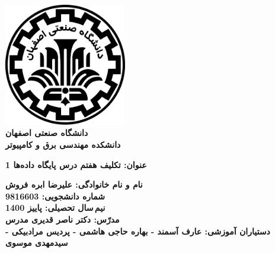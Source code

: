 \begin{titlepage}
\begin{center}
\includegraphics[width=0.4\textwidth]{figures/IUT Logo.png}\\
        
\LARGE
\textbf{دانشگاه صنعتی اصفهان}\\
\textbf{دانشکده مهندسی برق و کامپیوتر}\\
        
\vfill
        
\huge
\textbf{عنوان: تکلیف هفتم درس پایگاه داده‌ها 1}\\
        
\vfill
        
\LARGE
\textbf{نام و نام خانوادگی: علیرضا ابره فروش}\\
\textbf{شماره دانشجویی: 9816603}\\
\textbf{نیم\,سال تحصیلی: پاییز 1400}\\
\textbf{مدرّس: دکتر ناصر قدیری مدرس}\\
\textbf{دستیاران آموزشی: عارف آسمند - بهاره حاجی هاشمی - پردیس مرادبیکی - سیدمهدی موسوی}\\
\end{center}
\end{titlepage}
